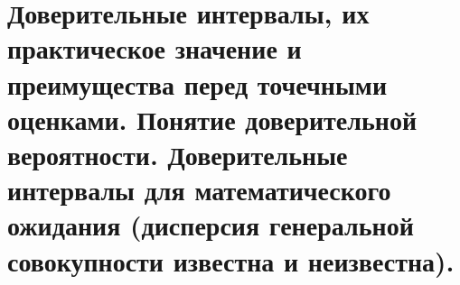 \documentclass[polytech/stats/exam-2023/stats-exam-2023.tex]{subfiles}
\begin{document}
\section{Доверительные интервалы, их практическое значение и преимущества перед точечными оценками. Понятие доверительной вероятности. Доверительные интервалы для математического ожидания (дисперсия генеральной совокупности известна и неизвестна).}
\end{document}
